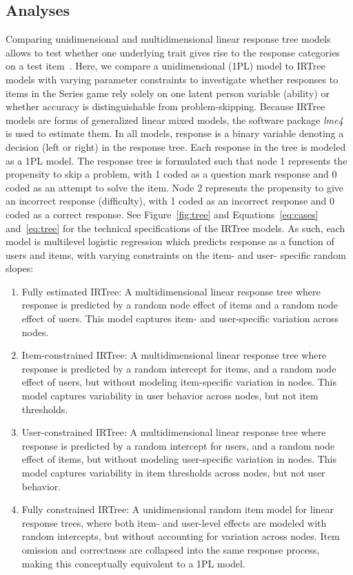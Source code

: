 \documentclass[11pt]{article}
\begin{document}
\subsection{Analyses}
\label{section:analyses}
Comparing unidimensional and multidimensional linear response tree models allows to test whether one underlying trait gives rise to the response categories on a test item~\parencite{de2012irtrees}. Here, we compare a unidimensional (1PL) model to IRTree models with varying parameter constraints to investigate whether responses to items in the Series game rely solely on one latent person variable (ability) or whether accuracy is distinguishable from problem-skipping. Because IRTree models are forms of generalized linear mixed models, the software package \textit{lme4}~\parencite{bates2015package} is used to estimate them. In all models, response is a binary variable denoting a decision (left or right) in the response tree. Each response in the tree is modeled as a 1PL model. The response tree is formulated such that node 1 represents the propensity to skip a problem, with 1 coded as a question mark response and 0 coded as an attempt to solve the item. Node 2 represents the propensity to give an incorrect response (difficulty), with 1 coded as an incorrect response and 0 coded as a correct response. See Figure~\ref{fig:tree} and Equations~\ref{eq:cases} and~\ref{eq:tree} for the technical specifications of the IRTree models. As such, each model is multilevel logistic regression which predicts response as a function of users and items, with varying constraints on the item- and user- specific random slopes: 

\begin{enumerate}
    \item Fully estimated IRTree: A multidimensional linear response tree where response is predicted by a random node effect of items and a random node effect of users. This model captures item- and user-specific variation across nodes. 
    \item Item-constrained IRTree: A multidimensional linear response tree where response is predicted by a random intercept for items, and a random node effect of users, but without modeling item-specific variation in nodes. This model captures variability in user behavior across nodes, but not item thresholds. 
    \item User-constrained IRTree: A multidimensional linear response tree where response is predicted by a random intercept for users, and a random node effect of items, but without modeling user-specific variation in nodes. This model captures variability in item thresholds across nodes, but not user behavior. 
    \item Fully constrained IRTree: A unidimensional random item model for linear response trees, where both item- and user-level effects are modeled with random intercepts, but without accounting for variation across nodes. Item omission and correctness are collapsed into the same response process, making this conceptually equivalent to a 1PL model. 
\end{enumerate}
\end{document}
